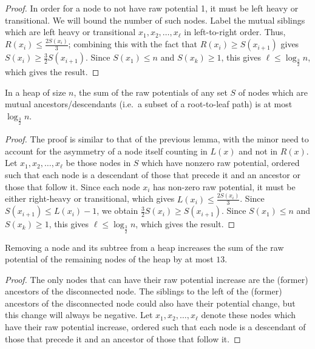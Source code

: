 \begin{fullonly}
\begin{proof}
In order for a node to not have raw potential 1, it must be left heavy or transitional. We will bound the number of such nodes.
Label the mutual siblings which are left heavy or transitional $x_1, x_2, \ldots , x_\ell$ in left-to-right order.
Thus, $R(x_i) \leq \frac{2S(x_i)}{3}$; combining this with the fact that $R(x_i) \geq S(x_{i+1})$ gives $S(x_i) \geq \frac{3}{2}S(x_{i+1})$. Since $S(x_1) \leq n$ and $S(x_k)\geq 1$, this gives $\ell \leq \log_\frac{3}{2} n$, which gives the result.
\end{proof}


\begin{lemma}  \checked
In a heap of size $n$, the sum of the raw potentials of any set $S$ of nodes which are mutual ancestors/descendants (i.e.~a subset of a root-to-leaf path) is at most $\log_\frac{3}{2} n$.
\end{lemma}

\begin{proof}
The proof is similar to that of the previous lemma, with the minor need to account for the asymmetry of a node itself counting in $L(x)$ and not in $R(x)$. Let $x_1, x_2, \ldots, x_\ell$ be those nodes in $S$ which have nonzero raw potential, ordered such that each node is a descendant of those that precede it and an ancestor or those that follow it. Since each node $x_i$ has non-zero raw potential, it must be either right-heavy or transitional, which gives $L(x_i) \leq \frac{2S(x_i)}{3}$. Since $S(x_{i+1}) \leq L(x_i)-1$, we obtain $\frac{3}{2}S(x_i) \geq S(x_{i+1})$. Since $S(x_1) \leq n$ and $S(x_k)\geq 1$, this gives $\ell \leq \log_\frac{3}{2} n$, which gives the result.
\end{proof}

\begin{lemma} 
Removing a node and its subtree from a heap increases the sum of the raw potential of the remaining nodes of the heap by at most $13$.
\end{lemma}

\begin{proof}
The only nodes that can have their raw potential increase are the (former) ancestors of the disconnected node. The siblings to the left of the (former) ancestors of the disconnected node could also have their potential change, but this change will always be negative.
Let  $x_1, x_2, \ldots, x_\ell$ denote these nodes which have their raw potential increase, ordered such that each node is a descendant of those that precede it and an ancestor of those that follow it.


\end{proof}
\end{fullonly}
